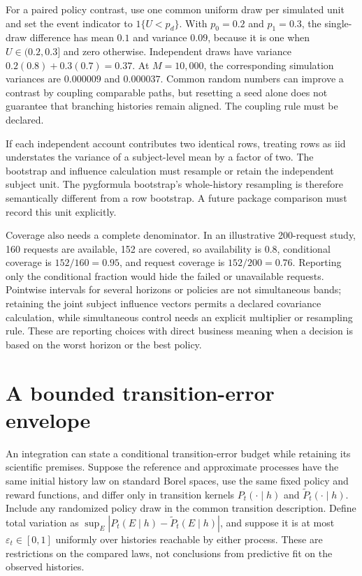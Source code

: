 For a paired policy contrast, use one common uniform draw per simulated unit
and set the event indicator to $1\{U<p_d\}$. With $p_0=0.2$ and $p_1=0.3$, the
single-draw difference has mean $0.1$ and variance $0.09$, because it is one
when $U\in(0.2,0.3]$ and zero otherwise. Independent draws have variance
$0.2(0.8)+0.3(0.7)=0.37$. At $M=10{,}000$, the corresponding simulation
variances are $0.000009$ and $0.000037$. Common random numbers can improve a
contrast by coupling comparable paths, but resetting a seed alone does not
guarantee that branching histories remain aligned. The coupling rule must be
declared.

If each independent account contributes two identical rows, treating rows as
iid understates the variance of a subject-level mean by a factor of two. The
bootstrap and influence calculation must resample or retain the independent
subject unit. The pygformula bootstrap's whole-history resampling is therefore
semantically different from a row bootstrap. A future package comparison must
record this unit explicitly.~\citep{v131_sw_pygformula,exec17_s5_math}

Coverage also needs a complete denominator. In an illustrative 200-request
study, 160 requests are available, 152 are covered, so availability is $0.8$,
conditional coverage is $152/160=0.95$, and request coverage is $152/200=0.76$.
Reporting only the conditional fraction would hide the failed or unavailable
requests. Pointwise intervals for several horizons or policies are not
simultaneous bands; retaining the joint subject influence vectors permits a
declared covariance calculation, while simultaneous control needs an explicit
multiplier or resampling rule. These are reporting choices with direct business
meaning when a decision is based on the worst horizon or the best policy.

\section{A bounded transition-error envelope}
\label{exec17:s5-error}

An integration can state a conditional transition-error budget while retaining
its scientific premises. Suppose the reference and approximate processes have
the same initial history law on standard Borel spaces, use the same fixed
policy and reward functions, and differ only in transition kernels
$P_t(\cdot\mid h)$ and $\widetilde P_t(\cdot\mid h)$. Include any randomized
policy draw in the common transition description. Define total variation as
$\sup_E|P_t(E\mid h)-\widetilde P_t(E\mid h)|$, and suppose it is at most
$\varepsilon_t\in[0,1]$ uniformly over histories reachable by either process.
These are restrictions on the compared laws, not conclusions from predictive
fit on the observed histories.

